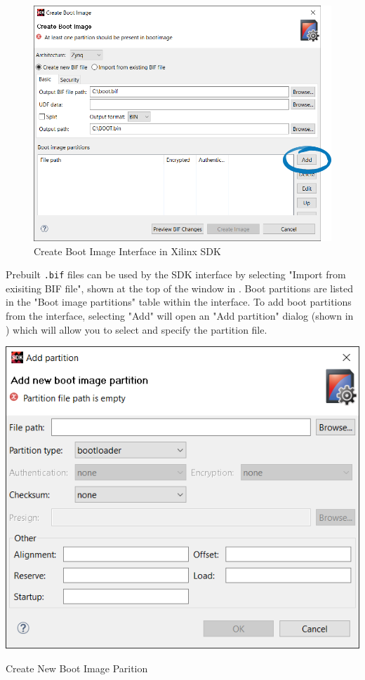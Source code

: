 \begin{figure}
	\centering
	\includegraphics{images/sdk/create_boot_image.png}
	\caption{Create Boot Image Interface in Xilinx SDK}
	\label{fig:createbootimage}
\end{figure}


Prebuilt \texttt{.bif} files can be used by the SDK interface by selecting "Import from exisiting BIF file", shown at the top of the window in . Boot partitions are listed in the "Boot image partitions" table within the interface. To add boot partitions from the interface, selecting "Add" will open an "Add partition" dialog (shown in ) which will allow you to select and specify the partition file.


\begin{marginfigure}
	\centering
	\includegraphics{images/sdk/boot_image_partition.png}
	\caption[Create New Boot Image Parition]{Create New Boot Image Parition}
	\label{fig:bootimagepartition}
\end{marginfigure}


